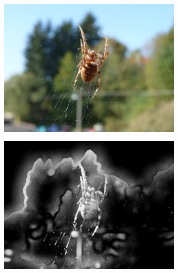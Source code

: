 \begin{figure}[H]
    \centering
    \begin{subfigure}{0.32\textwidth}
      \centering
      \includegraphics[scale=1.0]{obrazky/ORIGpavouk.JPG}
    \end{subfigure}
    \begin{subfigure}{.32\textwidth}
      \centering
      \includegraphics[scale=1.0]{obrazky/StentifordSMpavouk.jpg}
    \end{subfigure}
    \begin{subfigure}{.32\textwidth}
      \centering

\end{subfigure}
\end{figure}

